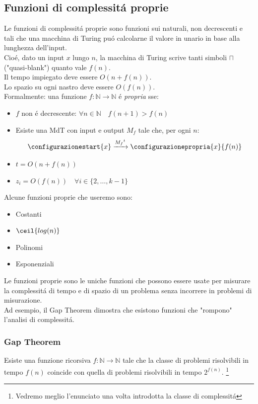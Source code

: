 \subsection{Funzioni di complessitá proprie}
Le funzioni di complessitá proprie sono funzioni sui naturali, non decrescenti e tali che una macchina di Turing puó calcolarne il valore in unario in base alla lunghezza dell'input. \\
Cioé, dato un input $x$ lungo $n$, la macchina di Turing scrive tanti simboli $\sqcap$ ("quasi-blank") quanto vale $f(n)$. \\
Il tempo impiegato deve essere $O(n + f(n))$. \\
Lo spazio su ogni nastro deve essere $O(f(n))$. \\
Formalmente: una funzione $f: \mathbb{N} \rightarrow \mathbb{N}$ é \textit{propria} sse:
\begin{itemize}
	\item $f$ non é decrescente: \quad $\forall n \in \mathbb{N} \quad f(n+1) > f(n)$
	\item Esiste una MdT con input e output $M_f$ tale che, per ogni $n$: \\
		\[
		\configurazionestart{x} \xrightarrow{{M_f}^t} \configurazionepropria{x}{f(n)}
		\]
	\item $t = O(n + f(n))$
	\item $z_i = O(f(n)) \quad \forall i \in \{2, \dots, k-1\}$
\end{itemize}

Alcune funzioni proprie che useremo sono:
\begin{itemize}
	\item Costanti
	\item $\ceil{log(n)}$
	\item Polinomi
	\item Esponenziali
\end{itemize}

Le funzioni proprie sono le uniche funzioni che possono essere usate per misurare la complessitá di tempo e di spazio di un problema senza incorrere in problemi di misurazione.\\ 
Ad esempio, il Gap Theorem dimostra che esistono funzioni che "rompono" l'analisi di complessitá.

\subsubsection{Gap Theorem}
Esiste una funzione ricorsiva $f: \mathbb{N} \rightarrow \mathbb{N}$ tale che la classe di problemi risolvibili in tempo $f(n)$ coincide con quella di problemi risolvibili in tempo $2^{f(n)}$. \footnote{Vedremo meglio l'enunciato una volta introdotta la classe di complessitá \TIME{}}
